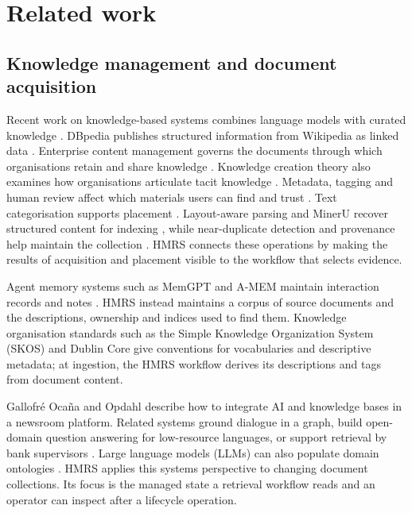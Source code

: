 \section{Related work}
\label{sec:related}

\subsection{Knowledge management and document acquisition}

Recent work on knowledge-based systems combines language models with curated
knowledge \citep{yang-kbs-llm-2025}. DBpedia publishes structured
information from Wikipedia as linked data \citep{auer-dbpedia-kb-2007}.
Enterprise content management governs the documents through which
organisations retain and share knowledge
\citep{paivarinta-ecm-2005,tyrvaainen-ecm-2006}. Knowledge creation theory
also examines how organisations articulate tacit knowledge
\citep{nonaka-seci-1994}.
Metadata, tagging and human review affect which materials users can find and
trust \citep{park-metadata-quality-2009,golder-tagging-2006,mosqueira-rey-hitl-2022}.
Text categorisation supports placement \citep{sebastiani2002machine}.
Layout-aware parsing and MinerU recover structured content for indexing
\citep{zhong-publaynet-layout-2019,huang-layoutlmv3-docai-2022,mineru}, while
near-duplicate detection and provenance help maintain the collection
\citep{manku-near-dup-2007,missier-prov-2013,cheney-provenance-2009}.
HMRS connects these operations by making the results of acquisition and
placement visible to the workflow that selects evidence.

Agent memory systems such as MemGPT and A-MEM maintain interaction
records and notes \citep{memgpt,amem}. HMRS instead maintains a corpus of
source documents and the descriptions, ownership and indices used to find
them. Knowledge organisation standards such as the Simple Knowledge
Organization System (SKOS) \citep{skos} and
Dublin Core \citep{dcmi-terms} give conventions for vocabularies and
descriptive metadata; at ingestion, the HMRS workflow derives its
descriptions and tags from document content.

Gallofr\'e Oca\~na and Opdahl \citep{ocaa2023software} describe how to
integrate AI and knowledge bases in a newsroom platform. Related systems
ground dialogue in a graph, build open-domain question answering for
low-resource languages, or support retrieval by bank supervisors
\citep{yang2024building,budur2024building,aarab2024system}. Large language
models (LLMs) can also populate domain ontologies \citep{ciatto2025large}.
HMRS applies this systems perspective to changing document collections.
Its focus is the managed state a retrieval workflow reads and an operator
can inspect after a lifecycle operation.

